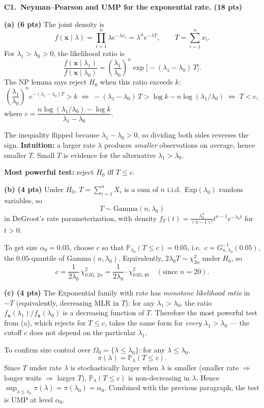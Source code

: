 \documentclass[11pt]{article}
\begin{document}
\textbf{C1.\ Neyman--Pearson and UMP for the exponential rate. (18 pts)}

\textbf{(a) (6 pts)} The joint density is
\[
    f(\mathbf{x} \mid \lambda) = \prod_{i=1}^n \lambda e^{-\lambda x_i} = \lambda^n e^{-\lambda T}, \qquad T = \sum_{i=1}^n x_i.
\]
For $\lambda_1 > \lambda_0 > 0$, the likelihood ratio is
\[
    \frac{f(\mathbf{x}\mid\lambda_1)}{f(\mathbf{x}\mid\lambda_0)}
    = \left(\frac{\lambda_1}{\lambda_0}\right)^{\!n} \exp\bigl[-(\lambda_1 - \lambda_0)\,T\bigr].
\]
The NP lemma says reject $H_0$ when this ratio exceeds $k$:
\[
    \left(\frac{\lambda_1}{\lambda_0}\right)^{\!n} e^{-(\lambda_1 - \lambda_0)T} > k
    \;\iff\; -(\lambda_1 - \lambda_0)\,T > \log k - n\log(\lambda_1/\lambda_0)
    \;\iff\; T < c,
\]
where $c = \dfrac{n\log(\lambda_1/\lambda_0) - \log k}{\lambda_1 - \lambda_0}$.

The inequality flipped because $\lambda_1 - \lambda_0 > 0$, so dividing both sides reverses the sign. \textbf{Intuition:} a larger rate $\lambda$ produces \emph{smaller} observations on average, hence smaller $T$. Small $T$ is evidence for the alternative $\lambda_1 > \lambda_0$.

\textbf{Most powerful test:} reject $H_0$ iff $T \le c$.

\textbf{(b) (4 pts)} Under $H_0$, $T = \sum_{i=1}^n X_i$ is a sum of $n$ i.i.d.\ Exp$(\lambda_0)$ random variables, so
\[
    T \sim \text{Gamma}(n, \lambda_0)
\]
in DeGroot's rate parameterization, with density $f_T(t) = \frac{\lambda_0^n}{(n-1)!}t^{n-1}e^{-\lambda_0 t}$ for $t > 0$.

To get size $\alpha_0 = 0.05$, choose $c$ so that $\mathbb{P}_{\lambda_0}(T \le c) = 0.05$, i.e.\ $c = G^{-1}_{n,\lambda_0}(0.05)$, the $0.05$-quantile of Gamma$(n, \lambda_0)$. Equivalently, $2\lambda_0 T \sim \chi^2_{2n}$ under $H_0$, so
\[
    c = \frac{1}{2\lambda_0}\, \chi^2_{0.05,\, 2n} = \frac{1}{2\lambda_0}\cdot \chi^2_{0.05, 40} \quad (\text{since } n = 20).
\]

\textbf{(c) (4 pts)} The Exponential family with rate has \emph{monotone likelihood ratio} in $-T$ (equivalently, decreasing MLR in $T$): for any $\lambda_1 > \lambda_0$, the ratio $f_\mathbf{x}(\lambda_1)/f_\mathbf{x}(\lambda_0)$ is a decreasing function of $T$. Therefore the most powerful test from (a), which rejects for $T \le c$, takes the same form for \emph{every} $\lambda_1 > \lambda_0$ --- the cutoff $c$ does not depend on the particular $\lambda_1$.

To confirm size control over $\Omega_0 = \{\lambda \le \lambda_0\}$: for any $\lambda \le \lambda_0$,
\[
    \pi(\lambda) = \mathbb{P}_\lambda(T \le c).
\]
Since $T$ under rate $\lambda$ is stochastically larger when $\lambda$ is smaller (smaller rate $\Rightarrow$ longer waits $\Rightarrow$ larger $T$), $\mathbb{P}_\lambda(T \le c)$ is non-decreasing in $\lambda$. Hence $\sup_{\lambda \le \lambda_0} \pi(\lambda) = \pi(\lambda_0) = \alpha_0$. Combined with the previous paragraph, the test is UMP at level $\alpha_0$.
\end{document}
